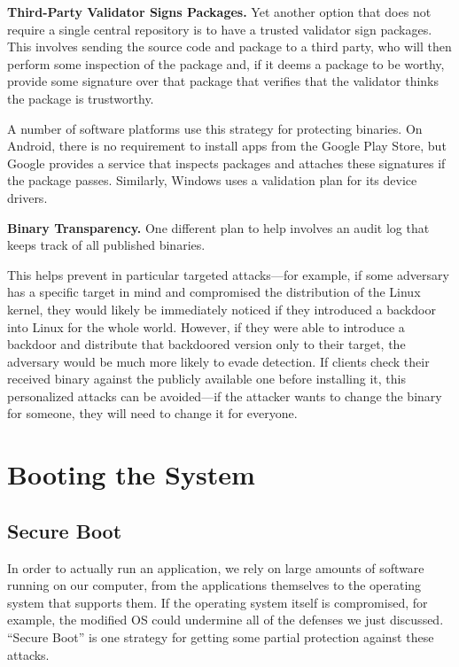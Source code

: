 \documentclass[
  letterpaper,
]{scrbook}
\theoremstyle{definition}
\theoremstyle{plain}
\theoremstyle{plain}
\theoremstyle{remark}
\begin{document}
\textbf{Third-Party Validator Signs Packages.} Yet another option that
does not require a single central repository is to have a trusted
validator sign packages. This involves sending the source code and
package to a third party, who will then perform some inspection of the
package and, if it deems a package to be worthy, provide some signature
over that package that verifies that the validator thinks the package is
trustworthy.

A number of software platforms use this strategy for protecting
binaries. On Android, there is no requirement to install apps from the
Google Play Store, but Google provides a service that inspects packages
and attaches these signatures if the package passes. Similarly, Windows
uses a validation plan for its device drivers.

\textbf{Binary Transparency.} One different plan to help involves an
audit log that keeps track of all published binaries.

This helps prevent in particular targeted attacks---for example, if some
adversary has a specific target in mind and compromised the distribution
of the Linux kernel, they would likely be immediately noticed if they
introduced a backdoor into Linux for the whole world. However, if they
were able to introduce a backdoor and distribute that backdoored version
only to their target, the adversary would be much more likely to evade
detection. If clients check their received binary against the publicly
available one before installing it, this personalized attacks can be
avoided---if the attacker wants to change the binary for someone, they
will need to change it for everyone.

\section{Booting the System}\label{booting-the-system}

\subsection{Secure Boot}\label{secure-boot}

In order to actually run an application, we rely on large amounts of
software running on our computer, from the applications themselves to
the operating system that supports them. If the operating system itself
is compromised, for example, the modified OS could undermine all of the
defenses we just discussed. ``Secure Boot'' is one strategy for getting
some partial protection against these attacks.
\end{document}

